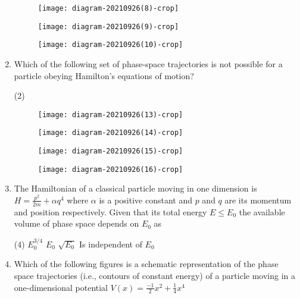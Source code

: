 \begin{enumerate}
\begin{tasks}
	\task[\textbf{B.}]\begin{figure}[H]
		\centering
		\texttt{[image: diagram-20210926(8)-crop]}
	\end{figure}
	\task[\textbf{C.}]\begin{figure}[H]
		\centering
		\texttt{[image: diagram-20210926(9)-crop]}
	\end{figure}
	\task[\textbf{D.}]\begin{figure}[H]
		\centering
		\texttt{[image: diagram-20210926(10)-crop]}
	\end{figure}
\end{tasks}
	\item Which of the following set of phase-space trajectories is not possible for a particle obeying Hamilton's equations of motion?
	{}
\begin{tasks}(2)
	\task[\textbf{A.}]\begin{figure}[H]
		\centering
		\texttt{[image: diagram-20210926(13)-crop]}
	\end{figure}
	\task[\textbf{B.}]\begin{figure}[H]
		\centering
		\texttt{[image: diagram-20210926(14)-crop]}
	\end{figure}
	\task[\textbf{C.}]\begin{figure}[H]
		\centering
		\texttt{[image: diagram-20210926(15)-crop]}
	\end{figure}
	\task[\textbf{D.}]\begin{figure}[H]
		\centering
		\texttt{[image: diagram-20210926(16)-crop]}
	\end{figure}
\end{tasks}
	\item The Hamiltonian of a classical particle moving in one dimension is $H=\frac{p^{2}}{2 m}+\alpha q^{4}$ where $\alpha$ is a positive constant and $p$ and $q$ are its momentum and position respectively. Given that its total energy $E \leq E_{0}$ the available volume of phase space depends on $E_{0}$ as
	{}
\begin{tasks}(4)
	\task[\textbf{A.}] $E_{0}^{3 / 4}$
	\task[\textbf{B.}]$E_{0}$
	\task[\textbf{C.}]$\sqrt{E_{0}}$
	\task[\textbf{D.}]Is independent of $E_{0}$
\end{tasks}
	\item Which of the following figures is a schematic representation of the phase space trajectories (i.e., contours of constant energy) of a particle moving in a one-dimensional potential $V(x)=\frac{-1}{2} x^{2}+\frac{1}{4} x^{4}$

\end{enumerate}

